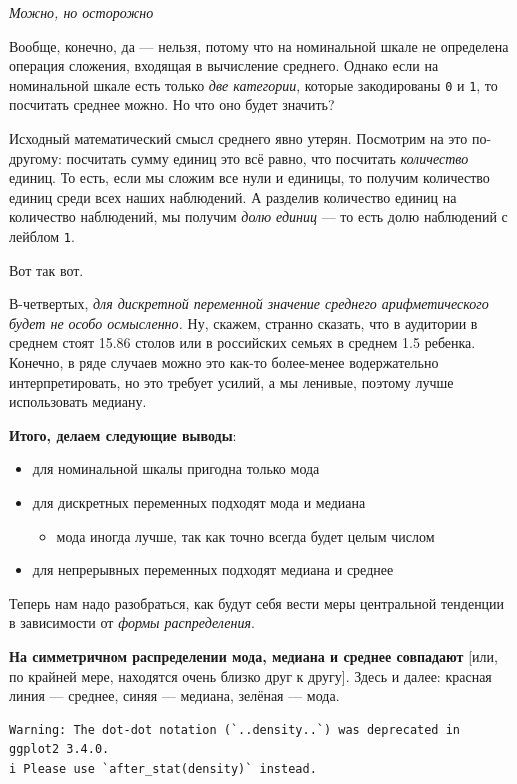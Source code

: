 \documentclass[
  letterpaper,
  DIV=11,
  numbers=noendperiod]{scrreprt}
\providecommand{\tightlist}{%
  \setlength{\itemsep}{0pt}\setlength{\parskip}{0pt}}\usepackage{longtable,booktabs,array}
\theoremstyle{definition}
\theoremstyle{remark}
\begin{document}
\emph{Можно, но осторожно}

Вообще, конечно, да --- нельзя, потому что на номинальной шкале не
определена операция сложения, входящая в вычисление среднего. Однако
если на номинальной шкале есть только \emph{две категории}, которые
закодированы \texttt{0} и \texttt{1}, то посчитать среднее можно. Но что
оно будет значить?

Исходный математический смысл среднего явно утерян. Посмотрим на это
по-другому: посчитать сумму единиц это всё равно, что посчитать
\emph{количество} единиц. То есть, если мы сложим все нули и единицы, то
получим количество единиц среди всех наших наблюдений. А разделив
количество единиц на количество наблюдений, мы получим \emph{долю
единиц} --- то есть долю наблюдений с лейблом \texttt{1}.

Вот так вот.

В-четвертых, \emph{для дискретной переменной значение среднего
арифметического будет не особо осмысленно.} Ну, скажем, странно сказать,
что в аудитории в среднем стоят 15.86 столов или в российских семьях в
среднем 1.5 ребенка. Конечно, в ряде случаев можно это как-то
более-менее водержательно интерпретировать, но это требует усилий, а мы
ленивые, поэтому лучше использовать медиану.

\textbf{Итого, делаем следующие выводы}:

\begin{itemize}
\tightlist
\item
  для номинальной шкалы пригодна только мода
\item
  для дискретных переменных подходят мода и медиана

  \begin{itemize}
  \tightlist
  \item
    мода иногда лучше, так как точно всегда будет целым числом
  \end{itemize}
\item
  для непрерывных переменных подходят медиана и среднее
\end{itemize}

Теперь нам надо разобраться, как будут себя вести меры центральной
тенденции в зависимости от \emph{формы распределения}.

\textbf{На симметричном распределении мода, медиана и среднее совпадают}
{[}или, по крайней мере, находятся очень близко друг к другу{]}. Здесь и
далее: красная линия --- среднее, синяя --- медиана, зелёная --- мода.

\begin{verbatim}
Warning: The dot-dot notation (`..density..`) was deprecated in ggplot2 3.4.0.
i Please use `after_stat(density)` instead.
\end{verbatim}
\end{document}
